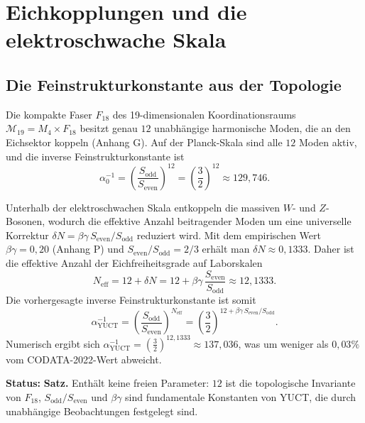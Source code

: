 \documentclass[12pt,a4paper]{article}
\begin{document}
	\section{Eichkopplungen und die elektroschwache Skala}
	\label{sec:gauge}
	
	\subsection{Die Feinstrukturkonstante aus der Topologie}
	
	Die kompakte Faser \(F_{18}\) des 19-dimensionalen Koordinationsraums \(\mathcal{M}_{19}=M_4\times F_{18}\) besitzt genau \(12\) unabhängige harmonische Moden, die an den Eichsektor koppeln (Anhang G). Auf der Planck-Skala sind alle \(12\) Moden aktiv, und die inverse Feinstrukturkonstante ist
	\begin{equation}
		\alpha_0^{-1} = \left(\frac{S_{\mathrm{odd}}}{S_{\mathrm{even}}}\right)^{12}
		= \left(\frac{3}{2}\right)^{12} \approx 129,746 .
	\end{equation}
	
	Unterhalb der elektroschwachen Skala entkoppeln die massiven \(W\)- und \(Z\)-Bosonen, wodurch die effektive Anzahl beitragender Moden um eine universelle Korrektur \(\delta N = \beta\gamma \, S_{\mathrm{even}}/S_{\mathrm{odd}}\) reduziert wird. Mit dem empirischen Wert \(\beta\gamma = 0,20\) (Anhang P) und \(S_{\mathrm{even}}/S_{\mathrm{odd}} = 2/3\) erhält man \(\delta N \approx 0,1333\). Daher ist die effektive Anzahl der Eichfreiheitsgrade auf Laborskalen
	\begin{equation}
		N_{\mathrm{eff}} = 12 + \delta N = 12 + \beta\gamma\,\frac{S_{\mathrm{even}}}{S_{\mathrm{odd}}} \approx 12,1333 .
	\end{equation}
	Die vorhergesagte inverse Feinstrukturkonstante ist somit
	\begin{equation}
		\boxed{\alpha^{-1}_{\mathrm{YUCT}} =
			\left(\frac{S_{\mathrm{odd}}}{S_{\mathrm{even}}}\right)^{N_{\mathrm{eff}}}
			= \left(\frac{3}{2}\right)^{12 + \beta\gamma\,S_{\mathrm{even}}/S_{\mathrm{odd}}} } .
		\label{eq:alpha-yuct}
	\end{equation}
	Numerisch ergibt sich \(\alpha^{-1}_{\mathrm{YUCT}} = \left(\frac{3}{2}\right)^{12,1333} \approx 137,036\), was um weniger als \(0,03\%\) vom CODATA-2022-Wert abweicht.
	
	\textbf{Status:} \textbf{Satz.} Enthält keine freien Parameter: \(12\) ist die topologische Invariante von \(F_{18}\), \(S_{\mathrm{odd}}/S_{\mathrm{even}}\) und \(\beta\gamma\) sind fundamentale Konstanten von YUCT, die durch unabhängige Beobachtungen festgelegt sind.
	
\end{document}
